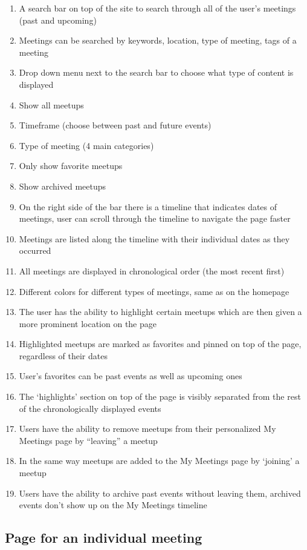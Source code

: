 \documentclass[conference]{IEEEtran}
\begin{document}
\begin{enumerate}
\item A search bar on top of the site to search through all of the
user’s meetings (past and upcoming)
\item Meetings can be searched by keywords, location, type of
meeting, tags of a meeting
\item Drop down menu next to the search bar to choose what
type of content is displayed
\item Show all meetups
\item Timeframe (choose between past and future
events)
\item Type of meeting (4 main categories)
\item Only show favorite meetups
\item Show archived meetups
\item On the right side of the bar there is a timeline that indicates dates of meetings, user can scroll through the timeline to navigate the page faster
\item Meetings are listed along the timeline with their individual dates as they occurred
\item All meetings are displayed in chronological order (the most recent first)
\item Different colors for different types of meetings, same as on the homepage
\item The user has the ability to highlight certain meetups which are then given a more prominent location on the page
\item Highlighted meetups are marked as favorites and pinned on top of the page, regardless of their dates
\item User’s favorites can be past events as well as upcoming ones
\item The ‘highlights’ section on top of the page is visibly separated from the rest of the chronologically displayed events
\item Users have the ability to remove meetups from their personalized My Meetings page by “leaving” a meetup
\item In the same way meetups are added to the My Meetings page by ‘joining’ a meetup
\item Users have the ability to archive past events without leaving them, archived events don’t show up on the My Meetings timeline
\end{enumerate}

\subsection{Page for an individual meeting}
\end{document}
